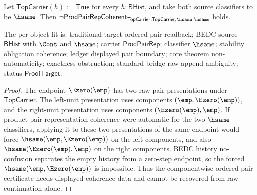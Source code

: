 \begin{theorem}
\label{thm:prod-pair-rep-coherence-not-automatic}
Let $\mathsf{TopCarrier}(h):=\mathsf{True}$ for every $h:\mathsf{BHist}$, and take both source classifiers to be $\hsame$. Then $\neg\mathsf{ProdPairRepCoherent}_{\mathsf{TopCarrier},\mathsf{TopCarrier},\hsame,\hsame}$ holds.

The per-object fit is: traditional target ordered-pair readback; BEDC source $\mathsf{BHist}$ with $\Cont$ and $\hsame$; carrier $\mathsf{ProdPairRep}$; classifier $\hsame$; stability obligation coherence; ledger displayed pair boundary; core theorem non-automaticity; exactness obstruction; standard bridge raw append ambiguity; status $\mathsf{ProofTarget}$.
\end{theorem}
\begin{proof}
The endpoint $\Ezero(\emp)$ has two raw pair presentations under $\mathsf{TopCarrier}$. The left-unit presentation uses components $(\emp,\Ezero(\emp))$, and the right-unit presentation uses components $(\Ezero(\emp),\emp)$. If product pair-representation coherence were automatic for the two $\hsame$ classifiers, applying it to these two presentations of the same endpoint would force $\hsame(\emp,\Ezero(\emp))$ on the left components, and also $\hsame(\Ezero(\emp),\emp)$ on the right components. BEDC history no-confusion separates the empty history from a zero-step endpoint, so the forced $\hsame(\emp,\Ezero(\emp))$ is impossible. Thus the componentwise ordered-pair certificate needs displayed coherence data and cannot be recovered from raw continuation alone.
\end{proof}
